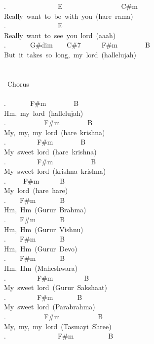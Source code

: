 {.\ \ \ \ \ \ \ \ \ \ \ \ \ \ \ E\ \ \ \ \ \ \ \ \ \ \ \ \ \ \ \ \ C\#m\\
Really\ want\ to\ be\ with\ you\ (hare\ rama)\\
.\ \ \ \ \ \ \ \ \ \ \ \ \ \ \ E\ \\
Really\ want\ to\ see\ you\ lord\ (aaah)\\
.\ \ \ \ \ \ \ G\#dim\ \ \ \ C\#7\ \ \ \ \ \ F\#m\ \ \ \ \ \ \ \ B\ \ \ \ \\
But\ it\ takes\ so\ long,\ my\ lord\ (hallelujah)\\
\\
\\
\lbrack\ Chorus\rbrack\\
\\
.\ \ \ \ \ \ \ F\#m\ \ \ \ \ \ \ \ B\\
Hm,\ my\ lord\ (hallelujah)\\
.\ \ \ \ \ \ \ \ \ \ \ F\#m\ \ \ \ \ \ \ \ B\\
My,\ my,\ my\ lord\ (hare\ krishna)\\
.\ \ \ \ \ \ \ \ \ F\#m\ \ \ \ \ \ \ \ B\\
My\ sweet\ lord\ (hare\ krishna)\\
.\ \ \ \ \ \ \ \ \ F\#m\ \ \ \ \ \ \ \ \ \ \ B\\
My\ sweet\ lord\ (krishna\ krishna)\\
.\ \ \ \ \ F\#m\ \ \ \ \ \ B\\
My\ lord\ (hare\ hare)\\
.\ \ \ \ F\#m\ \ \ \ \ \ \ B\ \\
Hm,\ Hm\ (Gurur\ Brahma)\\
.\ \ \ \ F\#m\ \ \ \ \ \ \ B\ \\
Hm,\ Hm\ (Gurur\ Vishnu)\\
.\ \ \ \ F\#m\ \ \ \ \ \ \ B\\
Hm,\ Hm\ (Gurur\ Devo)\\
.\ \ \ \ F\#m\ \ \ \ \ \ \ B\ \\
Hm,\ Hm\ (Maheshwara)\\
.\ \ \ \ \ \ \ \ \ F\#m\ \ \ \ \ \ \ \ \ B\\
My\ sweet\ lord\ (Gurur\ Sakshaat)\\
.\ \ \ \ \ \ \ \ \ F\#m\ \ \ \ \ \ \ B\\
My\ sweet\ lord\ (Parabrahma)\\
.\ \ \ \ \ \ \ \ \ \ \ F\#m\ \ \ \ \ \ \ \ \ \ \ B\\
My,\ my,\ my\ lord\ (Tasmayi\ Shree)\\
.\ \ \ \ \ \ \ \ \ \ \ \ \ \ \ F\#m\ \ \ \ \ \ \ \ \ \ B\\
}
